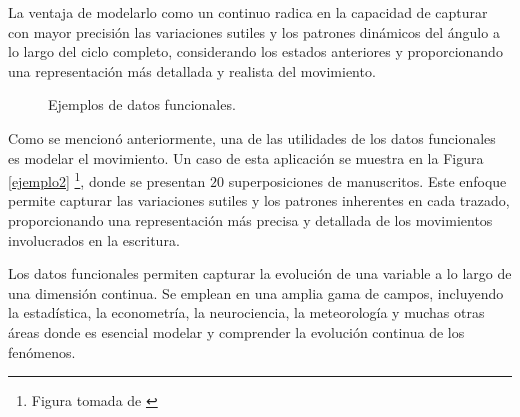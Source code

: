  La ventaja de modelarlo como un continuo radica en la capacidad de capturar con mayor precisión las variaciones sutiles y los patrones dinámicos del ángulo a lo largo del ciclo completo, considerando los estados anteriores y proporcionando una representación más detallada y realista del movimiento.

\begin{figure}[H]
 \centering
    \caption{Ejemplos de datos funcionales.}
    \label{fig:fdaEjemplo}
\end{figure}

Como se mencionó anteriormente, una de las utilidades de los datos funcionales es modelar el movimiento. Un caso de esta aplicación se muestra en la Figura \ref{ejemplo2} \footnote{Figura tomada de \cite{Ramsay2009}}, donde se presentan $20$ superposiciones de manuscritos. Este enfoque permite capturar las variaciones sutiles y los patrones inherentes en cada trazado, proporcionando una representación más precisa y detallada de los movimientos involucrados en la escritura. \cite[Pág. 8]{Ramsay2009}

Los datos funcionales permiten capturar la evolución de una variable a lo largo de una dimensión continua. Se emplean en una amplia gama de campos, incluyendo la estadística, la econometría, la neurociencia, la meteorología y muchas otras áreas donde es esencial modelar y comprender la evolución continua de los fenómenos. \cite{boxplotFun}

